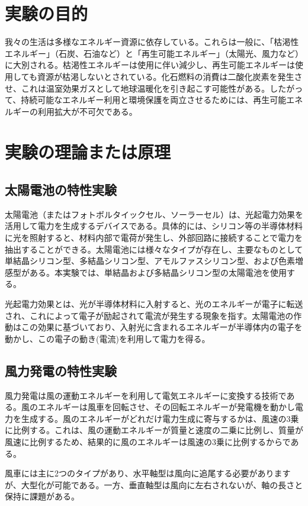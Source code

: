 \documentclass[a4paper,11pt,xelatex,ja=standard]{bxjsarticle}
\begin{document}
\section{実験の目的}

我々の生活は多様なエネルギー資源に依存している。これらは一般に、「枯渇性エネルギー」（石炭、石油など）と「再生可能エネルギー」（太陽光、風力など）に大別される。枯渇性エネルギーは使用に伴い減少し、再生可能エネルギーは使用しても資源が枯渇しないとされている。化石燃料の消費は二酸化炭素を発生させ、これは温室効果ガスとして地球温暖化を引き起こす可能性がある。したがって、持続可能なエネルギー利用と環境保護を両立させるためには、再生可能エネルギーの利用拡大が不可欠である。

\section{実験の理論または原理}
    \subsection{太陽電池の特性実験}
        太陽電池（またはフォトボルタイックセル、ソーラーセル）は、光起電力効果を活用して電力を生成するデバイスである。具体的には、シリコン等の半導体材料に光を照射すると、材料内部で電荷が発生し、外部回路に接続することで電力を抽出することができる。太陽電池には様々なタイプが存在し、主要なものとして単結晶シリコン型、多結晶シリコン型、アモルファスシリコン型、および色素増感型がある。本実験では、単結晶および多結晶シリコン型の太陽電池を使用する。

        光起電力効果とは、光が半導体材料に入射すると、光のエネルギーが電子に転送され、これによって電子が励起されて電流が発生する現象を指す。太陽電池の作動はこの効果に基づいており、入射光に含まれるエネルギーが半導体内の電子を動かし、この電子の動き(電流)を利用して電力を得る。
    \subsection{風力発電の特性実験}
        風力発電は風の運動エネルギーを利用して電気エネルギーに変換する技術である。風のエネルギーは風車を回転させ、その回転エネルギーが発電機を動かし電力を生成する。風のエネルギーがどれだけ電力生成に寄与するかは、風速の3乗に比例する。これは、風の運動エネルギーが質量と速度の二乗に比例し、質量が風速に比例するため、結果的に風のエネルギーは風速の3乗に比例するからである。

        風車には主に2つのタイプがあり、水平軸型は風向に追尾する必要がありますが、大型化が可能である。一方、垂直軸型は風向に左右されないが、軸の長さと保持に課題がある。
\end{document}
